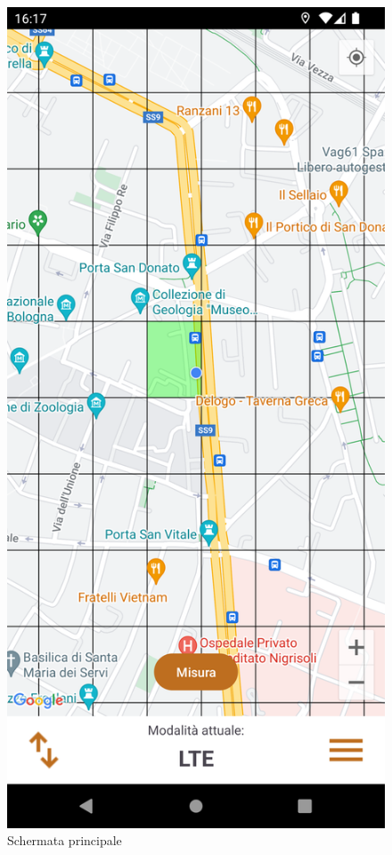 \documentclass[11pt]{article}
\begin{document}
\begin{minipage}[t]{0.25\textwidth}
    \begin{figure}[H]
        \centering
        \vspace*{-0.7cm}
        \includegraphics[width=\textwidth]{img/mainActivity.png}
        \caption{Schermata principale}
        \label{fig:mainActivity}
    \end{figure}
\end{minipage}
\end{document}

